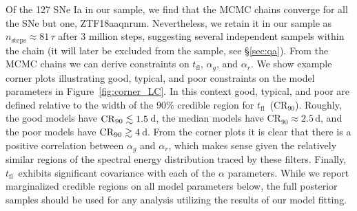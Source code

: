 \documentclass[twocolumn]{./aastex63}
\newcommand{\tfl}{$t_\mathrm{fl}$}
\begin{document}
Of the 127 SNe Ia in our sample, we find that the MCMC chains converge for
all the SNe but one, ZTF18aaqnrum. Nevertheless, we retain it in our sample
as $n_\mathrm{steps} \approx 81 \,\tau$ after 3 million steps, suggesting
several independent sampels within the chain (it will later be excluded from
the sample, see \S\ref{sec:qa}). From the MCMC chains we can derive
constraints on \tfl, $\alpha_g$, and $\alpha_r$. We show example corner plots
illustrating good, typical, and poor constraints on the model parameters in
Figure~\ref{fig:corner_LC}. In this context good, typical, and poor are
defined relative to the width of the 90\% credible region for \tfl\
($\mathrm{CR}_{90}$). Roughly, the good models have $\mathrm{CR}_{90} \lesssim
1.5$\,d, the median models have $\mathrm{CR}_{90} \approx 2.5$\,d, and the
poor models have $\mathrm{CR}_{90} \gtrsim 4$\,d. From the corner plots it is
clear that there is a positive correlation between $\alpha_g$ and $\alpha_r$,
which makes sense given the relatively similar regions of the spectral energy
distribution traced by these filters. Finally, \tfl\ exhibits significant
covariance with each of the $\alpha$ parameters. While we report marginalized
credible regions on all model parameters below, the full posterior samples
should be used for any analysis utilizing the results of our model fitting. 
\end{document}
